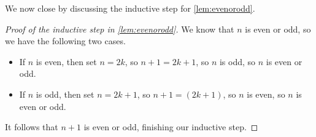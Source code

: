 We now close by discussing the inductive step for \autoref{lem:evenorodd}.
\begin{proof}[Proof of the inductive step in \autoref{lem:evenorodd}]
	We know that $n$ is even or odd, so we have the following two cases.
	\begin{itemize}
		\item If $n$ is even, then set $n=2k$, so $n+1=2k+1$, so $n$ is odd, so $n$ is even or odd.
		\item If $n$ is odd, then set $n=2k+1$, so $n+1=(2k+1)$, so $n$ is even, so $n$ is even or odd.
	\end{itemize}
	It follows that $n+1$ is even or odd, finishing our inductive step.
\end{proof}
